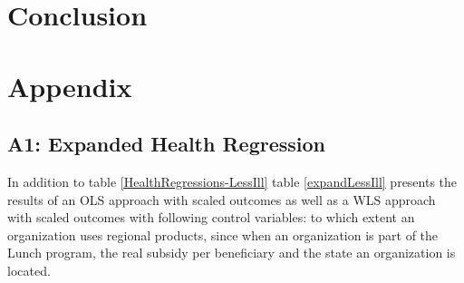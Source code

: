 \documentclass[12pt, a4paper, titlepage]{article}\usepackage[]{graphicx}\usepackage[]{color}
\begin{document}
\section{Conclusion}

\printbibliography

\section{Appendix}

\subsection{A1: Expanded Health Regression}

In addition to table \ref{HealthRegressions-LessIll} table \ref{expandLessIll} presents the results of an OLS approach with scaled outcomes as well as a WLS approach with scaled outcomes with following control variables: to which extent an organization uses regional products, since when an organization is part of the Lunch program, the real subsidy per beneficiary and the state an organization is located. 

% 
\end{document}
